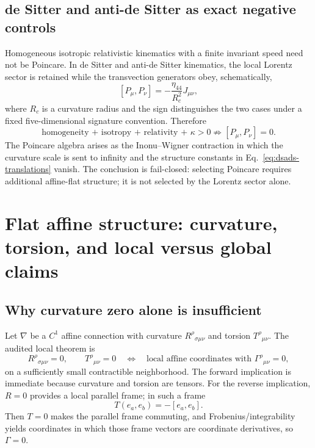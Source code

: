 \documentclass[11pt,a4paper]{article}
\begin{document}
\subsection{de Sitter and anti-de Sitter as exact negative controls}
Homogeneous isotropic relativistic kinematics with a finite invariant speed need not be Poincare.  In de Sitter and anti-de Sitter kinematics, the local Lorentz sector is retained while the transvection generators obey, schematically,
\begin{equation}
\boxed{
[P_\mu,P_\nu]
=-\frac{\eta_{44}}{R_c^2}J_{\mu\nu},}
\label{eq:dsads-translations}
\end{equation}
where $R_c$ is a curvature radius and the sign distinguishes the two cases under a fixed five-dimensional signature convention.  Therefore
\begin{equation}
\text{homogeneity + isotropy + relativity + }\kappa>0
\not\Longrightarrow [P_\mu,P_\nu]=0.
\end{equation}
The Poincare algebra arises as the Inonu--Wigner contraction in which the curvature scale is sent to infinity and the structure constants in Eq.~\eqref{eq:dsads-translations} vanish.  The conclusion is fail-closed: selecting Poincare requires additional affine-flat structure; it is not selected by the Lorentz sector alone.

\section{Flat affine structure: curvature, torsion, and local versus global claims}
\subsection{Why curvature zero alone is insufficient}
Let $\nabla$ be a $C^1$ affine connection with curvature $R^\rho{}_{\sigma\mu\nu}$ and torsion $T^\rho{}_{\mu\nu}$.  The audited local theorem is
\begin{equation}
\boxed{
R^\rho{}_{\sigma\mu\nu}=0,
\qquad
T^\rho{}_{\mu\nu}=0
\quad\Longleftrightarrow\quad
\text{local affine coordinates with }\Gamma^\rho{}_{\mu\nu}=0,}
\label{eq:flat-affine}
\end{equation}
on a sufficiently small contractible neighborhood.  The forward implication is immediate because curvature and torsion are tensors.  For the reverse implication, $R=0$ provides a local parallel frame; in such a frame
\begin{equation}
T(e_a,e_b)=-[e_a,e_b].
\label{eq:torsion-anholonomy}
\end{equation}
Then $T=0$ makes the parallel frame commuting, and Frobenius/integrability yields coordinates in which those frame vectors are coordinate derivatives, so $\Gamma=0$.
\end{document}
